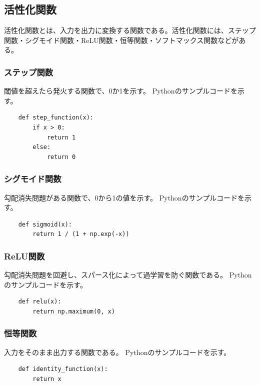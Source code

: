 \documentclass{ltjsarticle}
\begin{document}
\subsection{活性化関数}
活性化関数とは、入力を出力に変換する関数である。活性化関数には、ステップ関数・シグモイド関数・ReLU関数・恒等関数・ソフトマックス関数などがある。
\subsubsection{ステップ関数}
閾値を超えたら発火する関数で、0か1を示す。
Pythonのサンプルコードを示す。
\begin{screen}
  \begin{verbatim}
    def step_function(x):
        if x > 0:
            return 1
        else:
            return 0
  \end{verbatim}
\end{screen}

\subsubsection{シグモイド関数}
勾配消失問題がある関数で、0から1の値を示す。
Pythonのサンプルコードを示す。
\begin{screen}
  \begin{verbatim}
    def sigmoid(x):
        return 1 / (1 + np.exp(-x))
  \end{verbatim}
\end{screen}


\subsubsection{ReLU関数}
勾配消失問題を回避し、スパース化によって過学習を防ぐ関数である。
Pythonのサンプルコードを示す。
\begin{screen}
  \begin{verbatim}
    def relu(x):
        return np.maximum(0, x)
  \end{verbatim}
\end{screen}


\subsubsection{恒等関数}
入力をそのまま出力する関数である。
Pythonのサンプルコードを示す。
\begin{screen}
  \begin{verbatim}
    def identity_function(x):
        return x
  \end{verbatim}
\end{screen}
\end{document}
